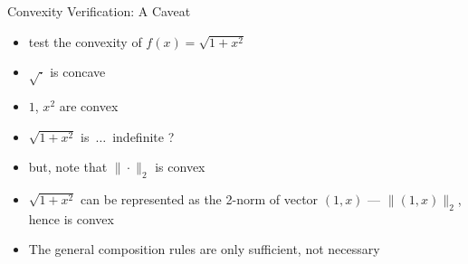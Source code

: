 \documentclass[10pt]{beamer}
\newcommand{\ds}{\displaystyle}
\theoremstyle{definition}
\begin{document}
\begin{frame}{Convexity Verification: A Caveat}

\begin{itemize}
  \item test the convexity of $\ds f(x) = \sqrt{1 + x^2}$
  \item $\sqrt{\cdot}$ is concave 
  \item $1$, $x^2$ are convex 
  \item $\sqrt{1 + x^2}$ is $\,\ldots\,$ indefinite ?
  \item but, note that $\ds\|\cdot\|_2$ is convex
  \item $\ds\sqrt{1 + x^2}$ can be represented as the 2-norm of vector $(1, x)$ --- $\ds\|(1, x)\|_2$, hence is convex
  \item The general composition rules are only sufficient, not necessary
\end{itemize}

\end{frame}


%  
%  
\end{document}
